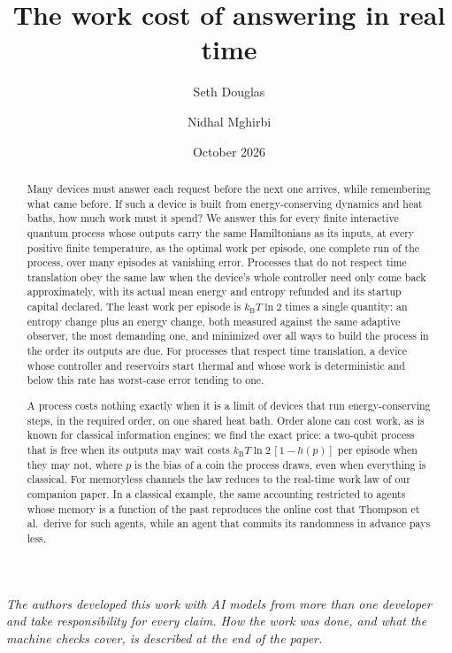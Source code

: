 \documentclass[11pt]{article}
\title{The work cost of answering in real time}
\author{Seth Douglas \and Nidhal Mghirbi}
\date{October 2026}
\theoremstyle{definition}
\theoremstyle{remark}
\newcommand{\kB}{k_{\mathrm B}}
\begin{document}
\maketitle

\begin{abstract}
Many devices must answer each request before the next one arrives, while remembering what came before. If such a device is built from energy-conserving dynamics and heat baths, how much work must it spend? We answer this for every finite interactive quantum process whose outputs carry the same Hamiltonians as its inputs, at every positive finite temperature, as the optimal work per episode, one complete run of the process, over many episodes at vanishing error. Processes that do not respect time translation obey the same law when the device's whole controller need only come back approximately, with its actual mean energy and entropy refunded and its startup capital declared. The least work per episode is $\kB T\ln2$ times a single quantity: an entropy change plus an energy change, both measured against the same adaptive observer, the most demanding one, and minimized over all ways to build the process in the order its outputs are due. For processes that respect time translation, a device whose controller and reservoirs start thermal and whose work is deterministic and below this rate has worst-case error tending to one.

A process costs nothing exactly when it is a limit of devices that run energy-conserving steps, in the required order, on one shared heat bath. Order alone can cost work, as is known for classical information engines; we find the exact price: a two-qubit process that is free when its outputs may wait costs $\kB T\ln2\,[1-h(p)]$ per episode when they may not, where $p$ is the bias of a coin the process draws, even when everything is classical. For memoryless channels the law reduces to the real-time work law of our companion paper. In a classical example, the same accounting restricted to agents whose memory is a function of the past reproduces the online cost that Thompson et al.\ derive for such agents, while an agent that commits its randomness in advance pays less.
\end{abstract}

\noindent\emph{The authors developed this work with AI models from more than one developer and take responsibility for every claim. How the work was done, and what the machine checks cover, is described at the end of the paper.}

{\small\tableofcontents}
\end{document}
